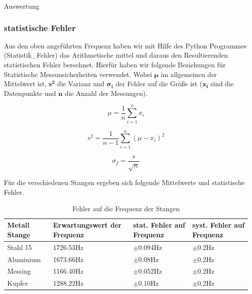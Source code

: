 \documentclass[twoside]{protokoll}
\begin{document}
\begin{aufgabe}{Auswertung}
\subsubsection{statistische Fehler} 

Aus den oben angeführten Frequenz haben wir mit Hilfe des Python Programmes (Statistik\_Fehler) das Arithmetische mittel und daraus den Resultierenden statistischen Fehler berechnet. Hierfür haben wir folgende Beziehungen für Statistische Messunsicherheiten verwendet. Wobei $\pmb{\mu}$ im allgemeinen der Mittelwert ist, $\mathbf{s^2}$ die Varianz und $\pmb{\sigma_i}$ der Fehler auf die Größe ist ($\mathbf{x_i}$ sind die Datenpunkte und $\mathbf{n}$ die Anzahl der Messungen).

\begin{equation}
	\mu = \frac{1}{n}\sum_{i=1}^nx_i
\end{equation}

\begin{equation}
	s^2 = \frac{1}{n-1}\sum_{i=1}^n(\mu-x_i)^2
\end{equation}

\begin{equation}
	\sigma_f = \frac{s}{\sqrt{n}} 
\end{equation}

Für die verschiedenen Stangen ergeben sich folgende Mittelwerte und statistische Fehler.\\


 \begin{table}[H]
        \centering
        \begin{tabularx}{1\textwidth}{X X X X} %
            \toprule
            \textbf{Metall Stange} & \textbf{Erwartungswert der Frequenz} & \textbf{stat. Fehler auf Frequenz} & \textbf{syst. Fehler auf Frequenz} \\
            \midrule
            Stahl 15 & 1726.53Hz & $\pm$0.094Hz & $\pm$0.2Hz\\
            Aluminium & 1673.66Hz & $\pm$0.08Hz & $\pm$0.2Hz \\
            Messing & 1166.40Hz & $\pm$0.052Hz & $\pm$0.2Hz \\
            Kupfer & 1288.22Hz & $\pm$0.10Hz & $\pm$0.2Hz \\
            \bottomrule
        \end{tabularx}
        \caption{Fehler auf die Frequenz der Stangen}
        \label{tab:mytable}
    \end{table}
    

\end{aufgabe}
\end{document}
